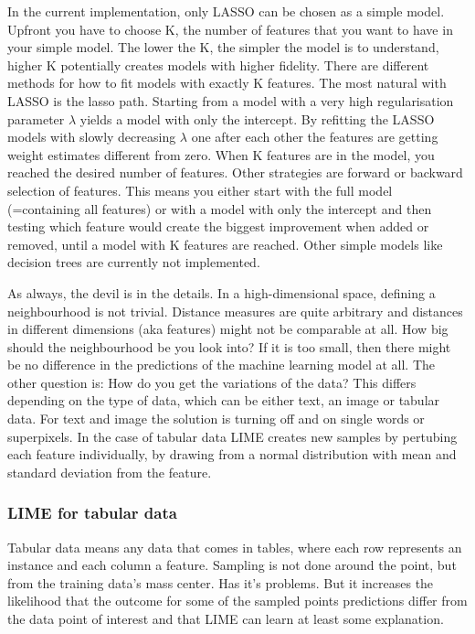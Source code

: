 \documentclass[12pt,]{krantz}
\theoremstyle{definition}
\theoremstyle{definition}
\theoremstyle{definition}
\theoremstyle{remark}
\begin{document}
In the current implementation, only LASSO can be chosen as a simple
model. Upfront you have to choose K, the number of features that you
want to have in your simple model. The lower the K, the simpler the
model is to understand, higher K potentially creates models with higher
fidelity. There are different methods for how to fit models with exactly
K features. The most natural with LASSO is the lasso path. Starting from
a model with a very high regularisation parameter \(\lambda\) yields a
model with only the intercept. By refitting the LASSO models with slowly
decreasing \(\lambda\) one after each other the features are getting
weight estimates different from zero. When K features are in the model,
you reached the desired number of features. Other strategies are forward
or backward selection of features. This means you either start with the
full model (=containing all features) or with a model with only the
intercept and then testing which feature would create the biggest
improvement when added or removed, until a model with K features are
reached. Other simple models like decision trees are currently not
implemented.

As always, the devil is in the details. In a high-dimensional space,
defining a neighbourhood is not trivial. Distance measures are quite
arbitrary and distances in different dimensions (aka features) might not
be comparable at all. How big should the neighbourhood be you look into?
If it is too small, then there might be no difference in the predictions
of the machine learning model at all. The other question is: How do you
get the variations of the data? This differs depending on the type of
data, which can be either text, an image or tabular data. For text and
image the solution is turning off and on single words or superpixels. In
the case of tabular data LIME creates new samples by pertubing each
feature individually, by drawing from a normal distribution with mean
and standard deviation from the feature.

\subsubsection{LIME for tabular data}\label{lime-for-tabular-data}

Tabular data means any data that comes in tables, where each row
represents an instance and each column a feature. Sampling is not done
around the point, but from the training data's mass center. Has it's
problems. But it increases the likelihood that the outcome for some of
the sampled points predictions differ from the data point of interest
and that LIME can learn at least some explanation.
\end{document}
